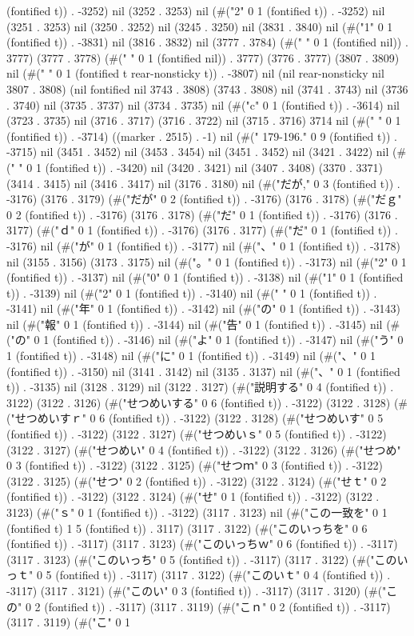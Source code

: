 (fontified t)) . -3252) nil (3252 . 3253) nil (#("2" 0 1 (fontified t)) . -3252) nil (3251 . 3253) nil (3250 . 3252) nil (3245 . 3250) nil (3831 . 3840) nil (#("1" 0 1 (fontified t)) . -3831) nil (3816 . 3832) nil (3777 . 3784) (#(" " 0 1 (fontified nil)) . 3777) (3777 . 3778) (#(" " 0 1 (fontified nil)) . 3777) (3776 . 3777) (3807 . 3809) nil (#(" " 0 1 (fontified t rear-nonsticky t)) . -3807) nil (nil rear-nonsticky nil 3807 . 3808) (nil fontified nil 3743 . 3808) (3743 . 3808) nil (3741 . 3743) nil (3736 . 3740) nil (3735 . 3737) nil (3734 . 3735) nil (#("c" 0 1 (fontified t)) . -3614) nil (3723 . 3735) nil (3716 . 3717) (3716 . 3722) nil (3715 . 3716) 3714 nil (#("
" 0 1 (fontified t)) . -3714) ((marker . 2515) . -1) nil (#(" 179-196." 0 9 (fontified t)) . -3715) nil (3451 . 3452) nil (3453 . 3454) nil (3451 . 3452) nil (3421 . 3422) nil (#(" " 0 1 (fontified t)) . -3420) nil (3420 . 3421) nil (3407 . 3408) (3370 . 3371) (3414 . 3415) nil (3416 . 3417) nil (3176 . 3180) nil (#("だが," 0 3 (fontified t)) . -3176) (3176 . 3179) (#("だが" 0 2 (fontified t)) . -3176) (3176 . 3178) (#("だｇ" 0 2 (fontified t)) . -3176) (3176 . 3178) (#("だ" 0 1 (fontified t)) . -3176) (3176 . 3177) (#("ｄ" 0 1 (fontified t)) . -3176) (3176 . 3177) (#("だ" 0 1 (fontified t)) . -3176) nil (#("が" 0 1 (fontified t)) . -3177) nil (#("、" 0 1 (fontified t)) . -3178) nil (3155 . 3156) (3173 . 3175) nil (#("。" 0 1 (fontified t)) . -3173) nil (#("2" 0 1 (fontified t)) . -3137) nil (#("0" 0 1 (fontified t)) . -3138) nil (#("1" 0 1 (fontified t)) . -3139) nil (#("2" 0 1 (fontified t)) . -3140) nil (#(" " 0 1 (fontified t)) . -3141) nil (#("年" 0 1 (fontified t)) . -3142) nil (#("の" 0 1 (fontified t)) . -3143) nil (#("報" 0 1 (fontified t)) . -3144) nil (#("告" 0 1 (fontified t)) . -3145) nil (#("の" 0 1 (fontified t)) . -3146) nil (#("よ" 0 1 (fontified t)) . -3147) nil (#("う" 0 1 (fontified t)) . -3148) nil (#("に" 0 1 (fontified t)) . -3149) nil (#("、" 0 1 (fontified t)) . -3150) nil (3141 . 3142) nil (3135 . 3137) nil (#("、" 0 1 (fontified t)) . -3135) nil (3128 . 3129) nil (3122 . 3127) (#("説明する" 0 4 (fontified t)) . 3122) (3122 . 3126) (#("せつめいする" 0 6 (fontified t)) . -3122) (3122 . 3128) (#("せつめいすｒ" 0 6 (fontified t)) . -3122) (3122 . 3128) (#("せつめいす" 0 5 (fontified t)) . -3122) (3122 . 3127) (#("せつめいｓ" 0 5 (fontified t)) . -3122) (3122 . 3127) (#("せつめい" 0 4 (fontified t)) . -3122) (3122 . 3126) (#("せつめ" 0 3 (fontified t)) . -3122) (3122 . 3125) (#("せつｍ" 0 3 (fontified t)) . -3122) (3122 . 3125) (#("せつ" 0 2 (fontified t)) . -3122) (3122 . 3124) (#("せｔ" 0 2 (fontified t)) . -3122) (3122 . 3124) (#("せ" 0 1 (fontified t)) . -3122) (3122 . 3123) (#("ｓ" 0 1 (fontified t)) . -3122) (3117 . 3123) nil (#("この一致を" 0 1 (fontified t) 1 5 (fontified t)) . 3117) (3117 . 3122) (#("このいっちを" 0 6 (fontified t)) . -3117) (3117 . 3123) (#("このいっちｗ" 0 6 (fontified t)) . -3117) (3117 . 3123) (#("このいっち" 0 5 (fontified t)) . -3117) (3117 . 3122) (#("このいっｔ" 0 5 (fontified t)) . -3117) (3117 . 3122) (#("このいｔ" 0 4 (fontified t)) . -3117) (3117 . 3121) (#("このい" 0 3 (fontified t)) . -3117) (3117 . 3120) (#("この" 0 2 (fontified t)) . -3117) (3117 . 3119) (#("こｎ" 0 2 (fontified t)) . -3117) (3117 . 3119) (#("こ" 0 1 